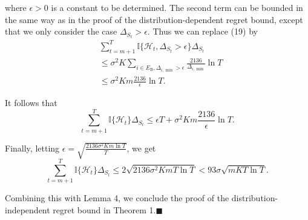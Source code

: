 \documentclass[opre,sglanonrev]{informs4}
\begin{document}
where $\epsilon>0$ is a constant to be determined. The second term can be bounded in the same way as in the proof of the distribution-dependent regret bound, except that we only consider the case $\Delta_{S_t}>\epsilon$. Thus we can replace (19) by
\begin{equation}
	\begin{aligned}
		&\sum_{t=m+1}^T\mathbb{I}\{\mathcal{H}_t,\Delta_{S_t}>\epsilon\}\Delta_{S_t}\\
		&\leq \sigma^2K\sum_{i\in E_\mathrm{B},\Delta_{i,\min}>\epsilon}\frac{2136}{\Delta_{i,\min}}\ln T\\
		&\leq \sigma^2Km\frac{2136}{\epsilon}\ln T.
	\end{aligned}
\end{equation}

It follows that
$$\sum_{t=m+1}^T\mathbb{I}\{\mathcal{H}_t\}\Delta_{S_t}\leq\epsilon T+\sigma^2Km\frac{2136}{\epsilon}\ln T.$$

Finally, letting $\epsilon=\sqrt{\frac{2136\sigma^2Km\ln T}{T}}$, we get 
$$\sum_{t=m+1}^T\mathbb{I}\{\mathcal{H}_t\}\Delta_{S_t}\leq2\sqrt{2136\sigma^2KmT\ln T}<93\sigma\sqrt{mKT\ln T}.$$

Combining this with Lemma 4, we conclude the proof of the distribution-independent regret bound in Theorem 1.\hfill $\blacksquare$

\end{document}
